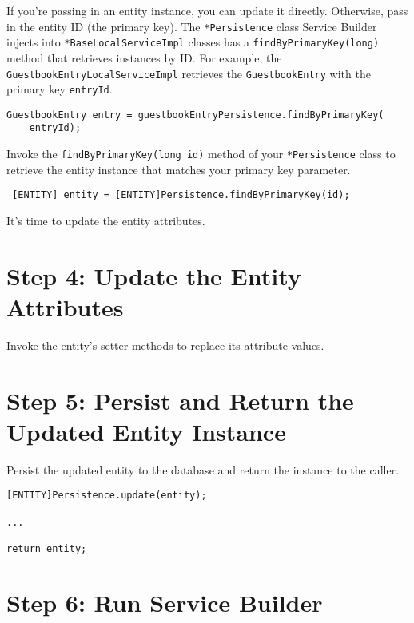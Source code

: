 If you're passing in an entity instance, you can update it directly.
Otherwise, pass in the entity ID (the primary key). The
\texttt{*Persistence} class Service Builder injects into
\texttt{*BaseLocalServiceImpl} classes has a
\texttt{findByPrimaryKey(long)} method that retrieves instances by ID.
For example, the \texttt{GuestbookEntryLocalServiceImpl} retrieves the
\texttt{GuestbookEntry} with the primary key \texttt{entryId}.

\begin{verbatim}
GuestbookEntry entry = guestbookEntryPersistence.findByPrimaryKey(
    entryId);
\end{verbatim}

Invoke the \texttt{findByPrimaryKey(long\ id)} method of your
\texttt{*Persistence} class to retrieve the entity instance that matches
your primary key parameter.

\begin{verbatim}
 [ENTITY] entity = [ENTITY]Persistence.findByPrimaryKey(id);
\end{verbatim}

It's time to update the entity attributes.

\section{Step 4: Update the Entity
Attributes}\label{step-4-update-the-entity-attributes}

Invoke the entity's setter methods to replace its attribute values.

\section{Step 5: Persist and Return the Updated Entity
Instance}\label{step-5-persist-and-return-the-updated-entity-instance}

Persist the updated entity to the database and return the instance to
the caller.

\begin{verbatim}
[ENTITY]Persistence.update(entity);

...

return entity;
\end{verbatim}

\section{Step 6: Run Service Builder}\label{step-6-run-service-builder}

